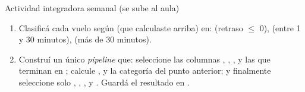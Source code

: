\documentclass[8pt]{beamer}
\begin{document}
\begin{frame}[fragile]{Actividad integradora semanal (se sube al aula)}
	\begin{enumerate}[start = 4]		
		\item Clasificá cada vuelo según  (que calculaste arriba) en:  (retraso $\leq$ 0),  (entre 1 y 30 minutos),  (más de 30 minutos). 
		
		\item Construí un único \textit{pipeline} que: seleccione las columnas , , ,  y las que terminan en ; calcule ,  y la categoría del punto anterior; y finalmente seleccione solo , , ,  y . Guardá el resultado en .
	\end{enumerate}
\end{frame}
\end{document}
